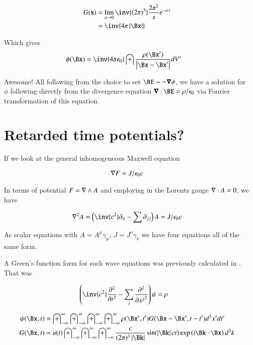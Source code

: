 \documentclass{article}
\newcommand{\PDSq}[2]{\frac{\partial^2 {#2}}{\partial {#1}^2}}
\newcommand{\IIinf}[0]{ \int_{-\infty}^\infty }
\begin{document}
\begin{align*}
G(\mathbf{x}) 
&= \lim_{a \rightarrow 0} \inv{(2\pi)^3} \frac{2 \pi^2}{x} e^{ - a x } \\
&= \inv{4\pi\Abs{\Bx}}
\end{align*}

Which gives
\begin{align*}
\phi(\Bx) &= \inv{4\pi \epsilon_0} \int \frac{\rho(\Bx')}{\Abs{\Bx - \Bx'}} dV'
\end{align*}

Awesome!  All following from the choice to set $\BE = -\spacegrad \phi$, we have a solution for $\phi$ following directly
from the divergence equation $\spacegrad \cdot \BE = \rho/\epsilon_0$ via Fourier transformation of this equation.

\section{ Retarded time potentials? }

If we look at the general inhomogeneous Maxwell equation

\begin{align}
\nabla F = J/\epsilon_0 c
\end{align}

In terms of potential $F = \nabla \wedge A$ and employing in the Lorentz gauge $\nabla \cdot A = 0$, we have

\begin{align}
\grad^2 A = \left(\inv{c^2} \partial_{tt} - \sum \partial_{jj}\right) A = J/\epsilon_0 c
\end{align}

As scalar equations with $A = A^\mu \gamma_\mu$, $J = J^\nu \gamma_\nu$ we have four equations all of the same form.

A Green's function form for such wave equations was previously calculated in \cite{PJfourierMaxwellSecondOrder}.  That was

\begin{align}
\left( \inv{c^2} \PDSq{t}{} -\sum_j \PDSq{x^j}{} \right)\psi &= \rho
\end{align}

\begin{align}
{\psi}(\Bx, t) &= \IIinf \IIinf \IIinf \IIinf \rho(\Bx', t') G(\Bx - \Bx', t - t') d^3 x' dt' \\
G(\Bx, t) &= u(t) \IIinf \IIinf \IIinf \frac{c}{(2\pi)^3 \Abs{\Bk}} \sin( \Abs{\Bk} c t ) \exp\left( i \Bk \cdot \Bx \right) d^3 k
\end{align}
\end{document}
